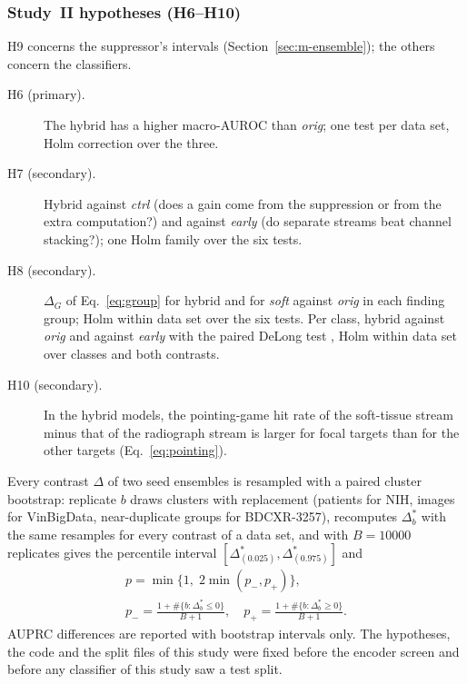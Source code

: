 \subsubsection{Study~II hypotheses (H6--H10)}
H9 concerns the suppressor's intervals (Section~\ref{sec:m-ensemble}); the others concern the classifiers.
\begin{description}
\item[H6 (primary).] The hybrid has a higher macro-AUROC than \emph{orig}; one test per data set, Holm correction over the three.
\item[H7 (secondary).] Hybrid against \emph{ctrl} (does a gain come from the suppression or from the extra computation?) and against
 \emph{early} (do separate streams beat channel stacking?); one Holm family over the six tests.
\item[H8 (secondary).] $\Delta_G$ of Eq.~\eqref{eq:group} for hybrid and for \emph{soft} against \emph{orig} in each finding group; Holm
 within data set over the six tests. Per class, hybrid against \emph{orig} and against \emph{early} with the paired DeLong test
 \cite{delong1988auc}, Holm within data set over classes and both contrasts.
\item[H10 (secondary).] In the hybrid models, the pointing-game hit rate of the soft-tissue stream minus that of the radiograph stream is
 larger for focal targets than for the other targets (Eq.~\eqref{eq:pointing}).
\end{description}
Every contrast $\Delta$ of two seed ensembles is resampled with a paired cluster bootstrap: replicate $b$ draws clusters with replacement
(patients for NIH, images for VinBigData, near-duplicate groups for BDCXR-3257), recomputes $\Delta^{*}_b$ with the same resamples for every
contrast of a data set, and with $B=\num{10000}$ replicates gives the percentile interval $[\Delta^{*}_{(0.025)},\Delta^{*}_{(0.975)}]$ and
\begin{equation}
\begin{gathered}
p=\min\big\{1,\;2\min(p_{-},p_{+})\big\},\\
p_{-}=\frac{1+\#\{b:\Delta^{*}_b\le0\}}{B+1},\quad p_{+}=\frac{1+\#\{b:\Delta^{*}_b\ge0\}}{B+1}.
\end{gathered}
\label{eq:bootp}
\end{equation}
AUPRC differences are reported with bootstrap intervals only. The hypotheses, the code and the split files of this study were fixed before
the encoder screen and before any classifier of this study saw a test split.
